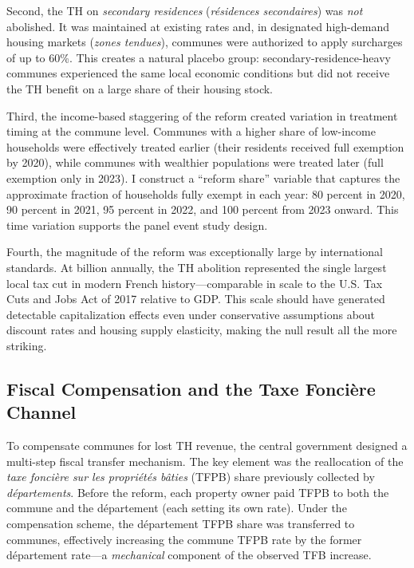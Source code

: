 \documentclass[12pt]{article}
\begin{document}
Second, the TH on \emph{secondary residences} (\emph{r\'esidences secondaires}) was \emph{not} abolished. It was maintained at existing rates and, in designated high-demand housing markets (\emph{zones tendues}), communes were authorized to apply surcharges of up to 60\%. This creates a natural placebo group: secondary-residence-heavy communes experienced the same local economic conditions but did not receive the TH benefit on a large share of their housing stock.

Third, the income-based staggering of the reform created variation in treatment timing at the commune level. Communes with a higher share of low-income households were effectively treated earlier (their residents received full exemption by 2020), while communes with wealthier populations were treated later (full exemption only in 2023). I construct a ``reform share'' variable that captures the approximate fraction of households fully exempt in each year: 80 percent in 2020, 90 percent in 2021, 95 percent in 2022, and 100 percent from 2023 onward. This time variation supports the panel event study design.

Fourth, the magnitude of the reform was exceptionally large by international standards. At  billion annually, the TH abolition represented the single largest local tax cut in modern French history---comparable in scale to the U.S. Tax Cuts and Jobs Act of 2017 relative to GDP. This scale should have generated detectable capitalization effects even under conservative assumptions about discount rates and housing supply elasticity, making the null result all the more striking.

\subsection{Fiscal Compensation and the Taxe Fonci\`ere Channel}

To compensate communes for lost TH revenue, the central government designed a multi-step fiscal transfer mechanism. The key element was the reallocation of the \emph{taxe fonci\`ere sur les propri\'et\'es b\^aties} (TFPB) share previously collected by \emph{d\'epartements}. Before the reform, each property owner paid TFPB to both the commune and the d\'epartement (each setting its own rate). Under the compensation scheme, the d\'epartement TFPB share was transferred to communes, effectively increasing the commune TFPB rate by the former d\'epartement rate---a \emph{mechanical} component of the observed TFB increase.
\end{document}
